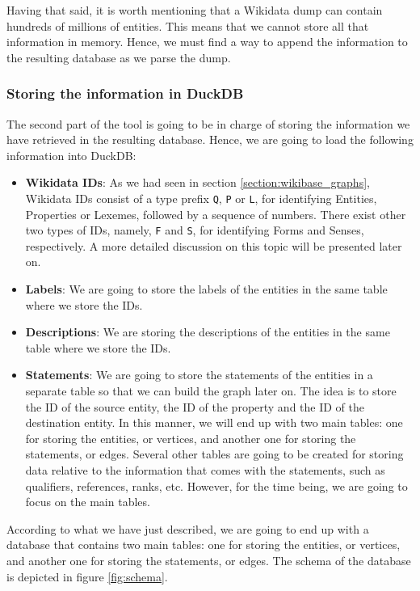 Having that said, it is worth mentioning that a Wikidata dump can contain hundreds of millions of entities. This means that we cannot store all that information in memory. Hence, we must find a way to append the information to the resulting database as we parse the dump.

\label{section:duckdb_load}
\subsubsection{Storing the information in DuckDB}

The second part of the tool is going to be in charge of storing the information we have retrieved in the resulting database. Hence, we are going to load the following information into DuckDB:

\begin{itemize}
    \itemsep0.5em
    \item \textbf{Wikidata IDs}: As we had seen in section \ref{section:wikibase_graphs}, Wikidata IDs consist of a type prefix \texttt{Q}, \texttt{P} or \texttt{L}, for identifying Entities, Properties or Lexemes, followed by a sequence of numbers. There exist other two types of IDs, namely, \texttt{F} and \texttt{S}, for identifying Forms and Senses, respectively. A more detailed discussion on this topic will be presented later on.
    \item \textbf{Labels}: We are going to store the labels of the entities in the same table where we store the IDs.
    \item \textbf{Descriptions}: We are storing the descriptions of the entities in the same table where we store the IDs.
    \item \textbf{Statements}: We are going to store the statements of the entities in a separate table so that we can build the graph later on. The idea is to store the ID of the source entity, the ID of the property and the ID of the destination entity. In this manner, we will end up with two main tables: one for storing the entities, or vertices, and another one for storing the statements, or edges. Several other tables are going to be created for storing data relative to the information that comes with the statements, such as qualifiers, references, ranks, etc. However, for the time being, we are going to focus on the main tables.
\end{itemize}

According to what we have just described, we are going to end up with a database that contains two main tables: one for storing the entities, or vertices, and another one for storing the statements, or edges. The schema of the database is depicted in figure \ref{fig:schema}.

